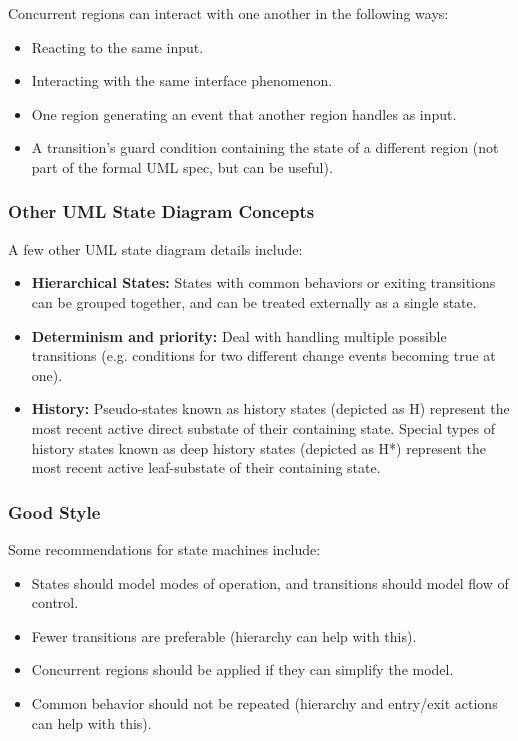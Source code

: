 \documentclass[12pt,titlepage]{article}
\begin{document}
        Concurrent regions can interact with one another in the following ways:
        \begin{itemize}
          \item Reacting to the same input.
          \item Interacting with the same interface phenomenon.
          \item One region generating an event that another region handles as input.
          \item A transition's guard condition containing the state of a different region (not part of the formal UML spec, but can be useful).
        \end{itemize}

      \subsubsection{Other UML State Diagram Concepts}
        A few other UML state diagram details include:
        \begin{itemize}
          \item \textbf{Hierarchical States:} States with common behaviors or exiting transitions can be grouped together, and can be treated externally as a
            single state.
          \item \textbf{Determinism and priority:} Deal with handling multiple possible transitions (e.g. conditions for two different change events
            becoming true at one).
          \item \textbf{History:} Pseudo-states known as history states (depicted as H) represent the most recent active direct substate of their containing state.
            Special types of history states known as deep history states (depicted as H*) represent the most recent active leaf-substate of their containing state.
        \end{itemize}

      \subsubsection{Good Style}
        Some recommendations for state machines include:
        \begin{itemize}
          \item States should model modes of operation, and transitions should model flow of control.
          \item Fewer transitions are preferable (hierarchy can help with this).
          \item Concurrent regions should be applied if they can simplify the model.
          \item Common behavior should not be repeated (hierarchy and entry/exit actions can help with this).
        \end{itemize}
\end{document}
